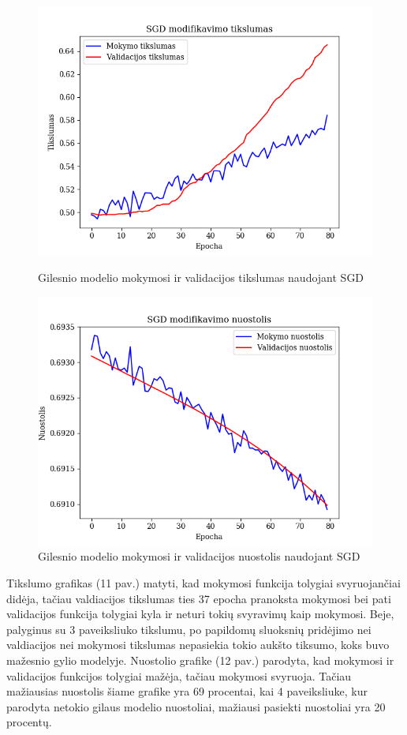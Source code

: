 \documentclass{VUMIFPSkursinis}
\begin{document}
\begin{figure}[!htbp]
  \centering
  \begin{minipage}[b]{0.49\textwidth}
    \includegraphics[width=\textwidth]{img/AL/SGD_acc.png}
    \caption{Gilesnio modelio mokymosi ir validacijos tikslumas naudojant SGD}
  \end{minipage}
  \begin{minipage}[b]{0.49\textwidth}
    \includegraphics[width=\textwidth]{img/AL/SGD_loss.png}
    \caption{Gilesnio modelio mokymosi ir validacijos nuostolis naudojant SGD}
  \end{minipage}
\end{figure}

Tikslumo grafikas (11 pav.) matyti, kad mokymosi funkcija tolygiai svyruojančiai didėja, tačiau valdiacijos tikslumas ties 37 epocha pranoksta mokymosi bei pati validacijos funkcija tolygiai kyla ir neturi 
tokių svyravimų kaip mokymosi. Beje, palyginus su 3 paveiksliuko tikslumu, po papildomų sluoksnių pridėjimo nei valdiacijos nei mokymosi tikslumas nepasiekia tokio aukšto tiksumo, koks buvo mažesnio gylio modelyje.
Nuostolio grafike (12 pav.) parodyta, kad mokymosi ir validacijos funkcijos tolygiai mažėja, tačiau mokymosi svyruoja. Tačiau mažiausias nuostolis šiame grafike yra 69 procentai, kai 4 paveiksliuke, kur parodyta 
netokio gilaus modelio nuostoliai, mažiausi pasiekti nuostoliai yra 20 procentų.
\end{document}
